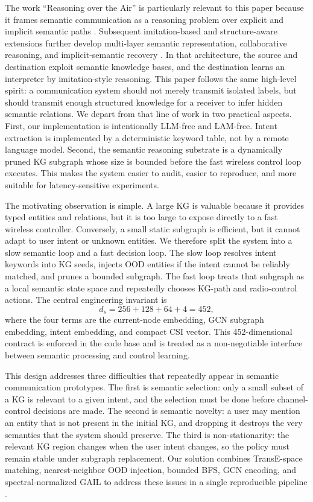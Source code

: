 \documentclass[journal]{IEEEtran}
\begin{document}
The work ``Reasoning over the Air'' is particularly relevant to this paper because it frames semantic communication as a reasoning problem over explicit and implicit semantic paths \cite{xiao2024reasoning}. Subsequent imitation-based and structure-aware extensions further develop multi-layer semantic representation, collaborative reasoning, and implicit-semantic recovery \cite{xiao2023imitation,liao2026hypergraph}. In that architecture, the source and destination exploit semantic knowledge bases, and the destination learns an interpreter by imitation-style reasoning. This paper follows the same high-level spirit: a communication system should not merely transmit isolated labels, but should transmit enough structured knowledge for a receiver to infer hidden semantic relations. We depart from that line of work in two practical aspects. First, our implementation is intentionally LLM-free and LAM-free. Intent extraction is implemented by a deterministic keyword table, not by a remote language model. Second, the semantic reasoning substrate is a dynamically pruned KG subgraph whose size is bounded before the fast wireless control loop executes. This makes the system easier to audit, easier to reproduce, and more suitable for latency-sensitive experiments.

The motivating observation is simple. A large KG is valuable because it provides typed entities and relations, but it is too large to expose directly to a fast wireless controller. Conversely, a small static subgraph is efficient, but it cannot adapt to user intent or unknown entities. We therefore split the system into a slow semantic loop and a fast decision loop. The slow loop resolves intent keywords into KG seeds, injects OOD entities if the intent cannot be reliably matched, and prunes a bounded subgraph. The fast loop treats that subgraph as a local semantic state space and repeatedly chooses KG-path and radio-control actions. The central engineering invariant is
\begin{equation}
\label{eq:state_contract_intro}
d_s = 256 + 128 + 64 + 4 = 452,
\end{equation}
where the four terms are the current-node embedding, GCN subgraph embedding, intent embedding, and compact CSI vector. This 452-dimensional contract is enforced in the code base and is treated as a non-negotiable interface between semantic processing and control learning.

This design addresses three difficulties that repeatedly appear in semantic communication prototypes. The first is semantic selection: only a small subset of a KG is relevant to a given intent, and the selection must be done before channel-control decisions are made. The second is semantic novelty: a user may mention an entity that is not present in the initial KG, and dropping it destroys the very semantics that the system should preserve. The third is non-stationarity: the relevant KG region changes when the user intent changes, so the policy must remain stable under subgraph replacement. Our solution combines TransE-space matching, nearest-neighbor OOD injection, bounded BFS, GCN encoding, and spectral-normalized GAIL to address these issues in a single reproducible pipeline \cite{bordes2013translating,kipf2017semi,ho2016gail,miyato2018spectral}.
\end{document}
